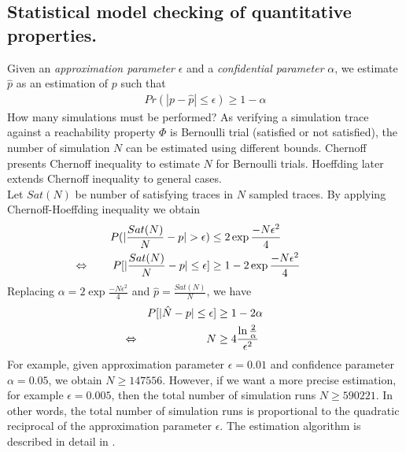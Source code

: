 \subsection{Statistical model checking of quantitative properties.}
Given an \textit{approximation parameter} $\epsilon$ and a \textit{confidential parameter}
$\alpha$, we estimate $\hat{p}$ as an estimation of $p$ such that
\begin{align*}
      Pr(|p-\hat{p}| \leq \epsilon) \geq 1 - \alpha
\end{align*}
How many simulations must be performed?  As verifying a simulation trace against a reachability
property $\Phi$ is Bernoulli trial (satisfied or not satisfied), the number of simulation $N$ can be
estimated using different bounds. Chernoff \cite{chernoff2014career} presents Chernoff inequality to
estimate $N$ for Bernoulli trials. Hoeffding \cite{hoeffding1963probability} later extends Chernoff
inequality to general cases.\\
Let $Sat(N)$ be number of satisfying traces in $N$ sampled traces. By applying Chernoff-Hoeffding
inequality we obtain
\begin{align*}
      P(|\frac{Sat(N)}{N}-p| > \epsilon)                                    & \leq 2\exp{\frac{-N\epsilon^2}{4}}     \\
      \llap{$\Leftrightarrow$ \qquad} P[|\frac{Sat(N)}{N}-p| \leq \epsilon] & \geq 1 - 2\exp{\frac{-N\epsilon^2}{4}}
\end{align*}
Replacing $\alpha = 2\exp{\frac{-N\epsilon^2}{4}}$ and $\hat{p}=\frac{Sat(N)}{N}$, we have
\begin{align*}
      P[|\hat{N} - p| \leq \epsilon]                  & \geq 1 - 2\alpha                               \\
      \llap{$\Leftrightarrow$ \qquad \qquad \qquad} N & \geq 4\frac{\ln{\frac{2}{\alpha}}}{\epsilon^2}
\end{align*}
For example, given approximation parameter $\epsilon=0.01$ and confidence parameter $\alpha=0.05$,
we obtain $N\geq 147556$. However, if we want a more precise estimation, for example
$\epsilon=0.005$, then the total number of simulation runs $N\geq 590221$. In other words, the total
number of simulation runs is proportional to the quadratic reciprocal of the approximation parameter
$\epsilon$. The estimation algorithm is described in detail in \cite{herault2004approximate}.
